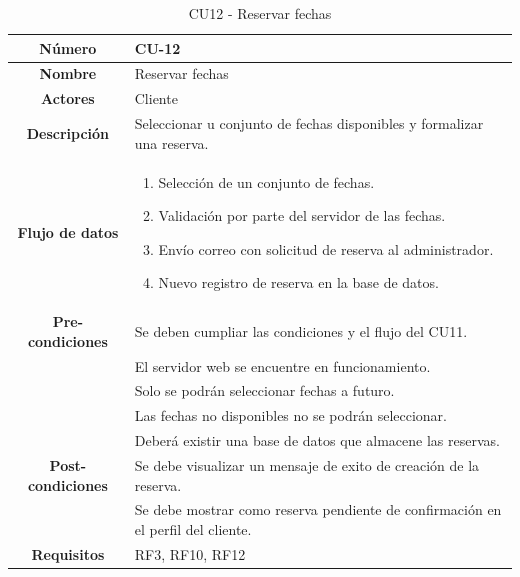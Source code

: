 \begin{table}[h!tb]
	\centering
	\begin{adjustbox}{width=1\textwidth}
	\begin{tabular}{|c|p{\textwidth}|}
		\hline {\bf Número} & CU-12 \\
		\hline {\bf Nombre} & Reservar fechas\\
		\hline {\bf Actores} & Cliente \\
		\hline {\bf Descripción} & Seleccionar u conjunto de fechas disponibles y formalizar una reserva. \\
		\hline {\bf Flujo de datos}
		& 
		\begin{enumerate}
			\item Selección de un conjunto de fechas.
			\item Validación por parte del servidor de las fechas.
			\item Envío correo con solicitud de reserva al administrador.
			\item Nuevo registro de reserva en la base de datos.
           
        \end{enumerate}\\
		\hline {\bf Pre-condiciones}
        & Se deben cumpliar las condiciones y el flujo del CU11. \\
		& El servidor web se encuentre en funcionamiento. \\
        & Solo se podrán seleccionar fechas a futuro. \\
        & Las fechas no disponibles no se podrán seleccionar. \\
        & Deberá existir una base de datos que almacene las reservas. \\
		\hline {\bf Post-condiciones}
		& Se debe visualizar un mensaje de exito de creación de la reserva. \\
        & Se debe mostrar como reserva pendiente de confirmación en el perfil del cliente. \\
		\hline {\bf Requisitos} & RF3, RF10, RF12 \\
		\hline 
	\end{tabular}
	\end{adjustbox}
	\caption{CU12 - Reservar fechas\label{tbl:CU12}}
\end{table}
